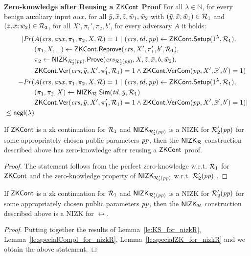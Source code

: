 \noindent \textbf{Zero-knowledge after Reusing a ${\mathsf{ZKCont}}$ Proof} For all $\lambda \in \mathbb{N}$, for every benign auxiliary input $aux$, 
for all $\bar{y},\bar{x},\bar{z}, \bar{w}_1, \bar{w}_2$ with $(\bar{y}, \bar{x}; \bar{w}_1) \in \mathcal{R}_1$ and $(\bar{z}, \bar{x}; \bar{w}_2) \in \mathcal{R}_2$, for all $X',\pi_1',\pi_2, b'$, for every adversary $A$ it holds:
\begin{align*}
| \mathit{Pr}(& A(\mathit{crs}, \mathit{aux}, \pi_1,\pi_2, X, \mathcal{R}) = 1 \ | \ (\mathit{crs}, \mathit{td}, \mathit{pp}) \leftarrow {\ensuremath{\mathsf{ZKCont}}}.{\mathsf{Setup}} (1^{\lambda}, \mathcal{R}_1), \\
                  &(\pi_1, X, \_) \leftarrow {\ensuremath{\mathsf{ZKCont}}}.{\mathsf{Reprove}} (\mathit{crs}, X', \pi_1', b', \mathcal{R}_1), \\
                  & \pi_2 \leftarrow {\ensuremath{\mathsf{NIZK_{\mathcal{R}'_2(\mathit{pp})}}}}.{\mathsf{Prove}}(\mathit{crs}_{\mathcal{R}'_2(\mathit{pp})}, X, \bar{z}, \bar{x}, b, \bar{w}_2), \\
                  &  {\mathsf{ZKCont}}.{\mathsf{Ver}}(\mathit{crs}, \bar{y}, X', \pi'_1, \mathcal{R}_1) = 1 
                  \wedge {\ensuremath{\mathsf{ZKCont}}}.{\mathsf{VerCom}}(\mathit{pp}, X', \bar{x}', b') = 1)   \\
- \mathit{Pr}(& A(\mathit{crs}, \mathit{aux}, \pi_1,\pi_2, X, \mathcal{R}) = 1 \ | \ (\mathit{crs}, \mathit{td}, \mathit{pp}) \leftarrow {\ensuremath{\mathsf{ZKCont}}}.{\mathsf{Setup}} (1^{\lambda}, \mathcal{R}_1), \\ 
                     & (\pi_1,\pi_2, X) \leftarrow {\ensuremath{\mathsf{NIZK_{\mathcal{R}}}}}.{\mathsf{Sim}}(\mathit{td}, \bar{y}, \mathcal{R}_1) \\ 
                     &  {\mathsf{ZKCont}}.{\mathsf{Ver}}(\mathit{crs}, \bar{y}, X', \pi'_1, \mathcal{R}_1) = 1 \wedge {\ensuremath{\mathsf{ZKCont}}}.{\mathsf{VerCom}}(\mathit{pp}, X', \bar{x}', b') = 1) | \\
                    \leq \mathsf{negl}(\lambda)
\end{align*}

\begin{lemma} 
\label{le:specialZK_for_nizkR}
If ${\mathsf{ZKCont}}$ is a zk continuation for $\mathcal{R}_1$ and ${\mathsf{NIZK_{\mathcal{R}'_2(\mathit{pp})}}}$ is a NIZK for $\mathcal{R}_2'(\mathit{pp})$ for some appropriately chosen public parameters $\mathit{pp}$, 
then the ${\mathsf{NIZK_{\mathcal{R}}}}$ construction described above has zero-knowledge after reusing a ${\mathsf{ZKCont}}$ proof.
\end{lemma} 
\begin{proof} The statement follows from the perfect zero-knowledge w.r.t. $\mathcal{R}_1$ for ${\mathsf{ZKCont}}$ and 
the zero-knowledge property of ${\mathsf{NIZK_{\mathcal{R}'_2(\mathit{pp})}}}$ w.r.t. $\mathcal{R}_2'(\mathit{pp})$ .
\end{proof}
 
\begin{corollary}
If ${\mathsf{ZKCont}}$ is a zk continuation for $\mathcal{R}_1$ and ${\mathsf{NIZK_{\mathcal{R}'_2(\mathit{pp})}}}$ is a NIZK for $\mathcal{R}_2'(\mathit{pp})$ for some appropriately chosen public parameters $\mathit{pp}$, 
then the ${\mathsf{NIZK_{\mathcal{R}}}}$ construction described above is a NIZK for $\rel$.
 \end{corollary}
 
\begin{proof} Putting together the results of Lemma~\ref{le:KS_for_nizkR}, Lemma~\ref{le:specialCompl_for_nizkR}, 
Lemma~\ref{le:specialZK_for_nizkR} and  we obtain the above statement.
\end{proof} 
